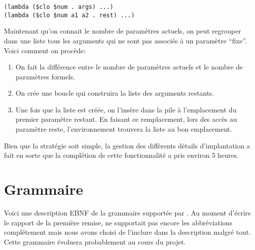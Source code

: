 \documentclass[11pt]{report}
\begin{document}
\begin{verbatim}
(lambda ($clo $num . args) ...)
(lambda ($clo $num a1 a2 . rest) ...)
\end{verbatim}

Maintenant qu'on connait le nombre de paramètres actuels, on peut
regrouper dans une liste tous les arguments qui ne sont pas associés
à un paramètre ``fixe''.  Voici comment on procède:

\begin{enumerate}
\item On fait la différence entre le nombre de paramètres actuels et
  le nombre de paramètres formels.
\item On crée une boucle qui construira la liste des arguments restants.
\item Une fois que la liste est créée, on l'insère dans la pile à
  l'emplacement du premier paramètre restant.  En faisant ce
  remplacement, lors des accès au paramètre reste, l'environnement
  trouvera la liste au bon emplacement.
\end{enumerate}

Bien que la stratégie soit simple, la gestion des différents détails
d'implantation a fait en sorte que la complétion de cette
fonctionnalité a pris environ 5 heures.




\appendix
\chapter{Grammaire}
\label{grammaire}
Voici une description EBNF de la grammaire supportée par \sins{}. Au
moment d'écrire le rapport de la première remise, \sins{} ne
supportait pas encore les abbréviations complétement mais nous avons
choisi de l'inclure dans la description malgré tout. Cette grammaire
évoluera probablement au cours du projet.

\setlength{\grammarindent}{3em}
\end{document}
